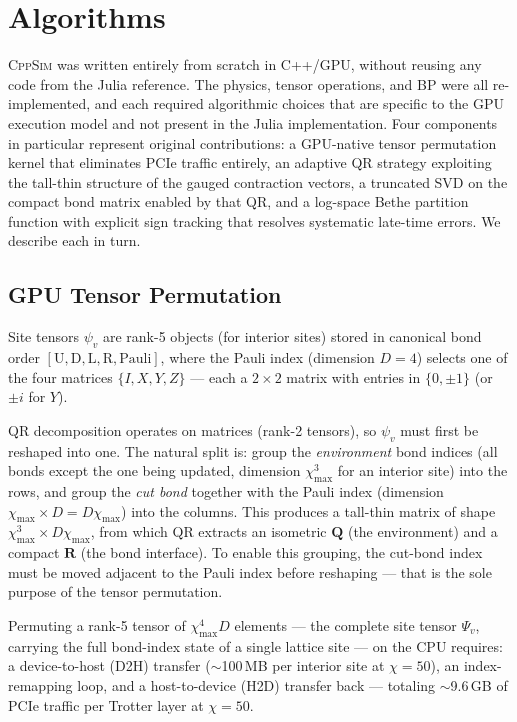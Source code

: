 \documentclass[11pt]{article}
\newcommand{\chimax}{\chi_{\mathrm{max}}}
\begin{document}
\section{Algorithms}
\label{sec:algorithms}

\textsc{CppSim} was written entirely from scratch in C++/GPU, without reusing
any code from the Julia reference. The physics, tensor operations, and BP
were all re-implemented, and each required algorithmic choices that are specific
to the GPU execution model and not present in the Julia implementation.
Four components in particular represent original contributions: a GPU-native
tensor permutation kernel that eliminates PCIe traffic entirely, an adaptive
QR strategy exploiting the tall-thin structure of the gauged contraction vectors,
a truncated SVD on the compact bond matrix enabled by that QR, and a
log-space Bethe partition function with explicit sign tracking that resolves
systematic late-time errors. We describe each in turn.

\subsection{GPU Tensor Permutation}
\label{sec:permute}

Site tensors $\psi_v$ are rank-5 objects (for interior sites) stored in canonical
bond order $[\text{U}, \text{D}, \text{L}, \text{R}, \text{Pauli}]$,
where the Pauli index (dimension $D=4$) selects one of the four matrices
$\{I, X, Y, Z\}$ — each a $2\times2$ matrix with entries in $\{0, \pm1\}$ (or
$\pm i$ for $Y$).

QR decomposition operates on matrices (rank-2 tensors), so $\psi_v$ must first
be reshaped into one. The natural split is: group the \emph{environment} bond
indices (all bonds except the one being updated, dimension $\chimax^3$ for an
interior site) into the rows, and group the \emph{cut bond} together with the
Pauli index (dimension $\chimax \times D = D\chimax$) into the columns.
This produces a tall-thin matrix of shape $\chimax^3 \times D\chimax$, from
which QR extracts an isometric $\mathbf{Q}$ (the environment) and a compact
$\mathbf{R}$ (the bond interface).
To enable this grouping, the cut-bond index must be moved adjacent to the Pauli
index before reshaping — that is the sole purpose of the tensor permutation.

Permuting a rank-5 tensor of $\chimax^4 D$ elements ---
the complete site tensor $\Psi_v$, carrying the full bond-index state of a
single lattice site --- on the CPU requires:
a device-to-host (D2H) transfer ($\sim$100\,MB per interior site at $\chi=50$),
an index-remapping loop, and a host-to-device (H2D) transfer back ---
totaling $\sim$9.6\,GB of PCIe traffic per Trotter layer at $\chi=50$.
\end{document}
